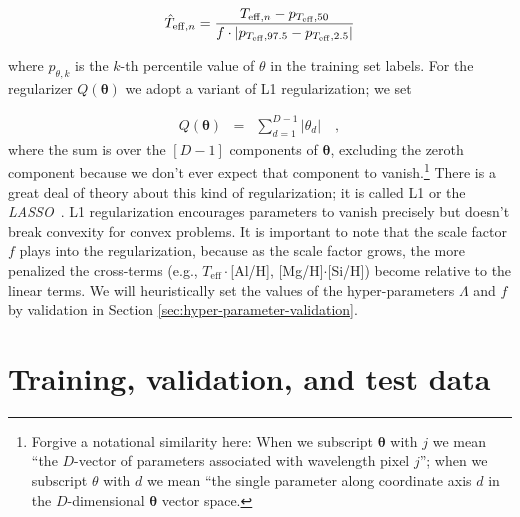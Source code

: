 \documentclass[12pt,preprint]{aastex}
\newcommand{\project}[1]{\textsl{#1}}
\newcommand{\acronym}[1]{{\small{#1}}}
\newcommand{\lasso}{\project{\acronym{LASSO}}}
\newcommand{\Teff}{T_{\mathrm{eff}}}
\newcommand{\Dvector}[1]{\boldsymbol{#1}}
\newcommand{\vectheta}{\Dvector{\theta}}
\begin{document}
\begin{eqnarray}\label{eq:label-norm}
  \hat{T}_{\mathrm{eff},n} = \frac{T_{{\rm eff},n} - p_{\Teff,50}}{f\cdot|p_{\Teff,97.5} - p_{\Teff,2.5}|}
\end{eqnarray}

\noindent{}where $p_{\theta,k}$ is the $k$-th percentile value of $\theta$ in
the training set labels. For the regularizer $Q(\vectheta)$ we adopt a variant
of L1 regularization; we set

\begin{eqnarray}\label{eq:l1-variant}
  Q(\vectheta) &=& \sum_{d=1}^{D-1} |\theta_d|
  \quad,
\end{eqnarray}
where the sum is over the $[D-1]$ components of $\vectheta$, excluding the 
zeroth component because we don't ever expect that component to vanish.\footnote{Forgive a notational similarity here: When we subscript $\vectheta$ 
with $j$ we mean ``the $D$-vector of parameters associated with wavelength pixel
$j$''; when we subscript $\theta$ with $d$ we mean ``the single parameter along 
coordinate axis $d$ in the $D$-dimensional $\vectheta$ vector space.} There is
a great deal of theory about this kind of regularization; it is called L1 or the
\lasso\ \citep{Tibshirani_1996}.  L1 regularization encourages parameters to vanish 
precisely but doesn't break convexity for convex problems.  It is important to
note that the scale factor $f$ plays into the regularization, because as the 
scale factor grows, the more penalized the cross-terms (e.g., $\Teff\cdot$[Al/H], [Mg/H]$\cdot$[Si/H]) become 
relative to the linear terms.  We will heuristically set the values of the hyper-parameters
$\Lambda$ and $f$ by validation in Section \ref{sec:hyper-parameter-validation}.





\section{Training, validation, and test data}
\label{sec:training-set}
\end{document}
